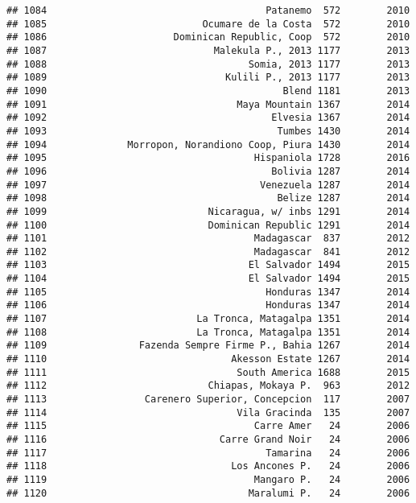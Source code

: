 \documentclass[
]{article}
\begin{document}
\begin{verbatim}
## 1084                                      Patanemo  572        2010
## 1085                           Ocumare de la Costa  572        2010
## 1086                      Dominican Republic, Coop  572        2010
## 1087                             Malekula P., 2013 1177        2013
## 1088                                   Somia, 2013 1177        2013
## 1089                               Kulili P., 2013 1177        2013
## 1090                                         Blend 1181        2013
## 1091                                 Maya Mountain 1367        2014
## 1092                                       Elvesia 1367        2014
## 1093                                        Tumbes 1430        2014
## 1094              Morropon, Norandiono Coop, Piura 1430        2014
## 1095                                    Hispaniola 1728        2016
## 1096                                       Bolivia 1287        2014
## 1097                                     Venezuela 1287        2014
## 1098                                        Belize 1287        2014
## 1099                            Nicaragua, w/ inbs 1291        2014
## 1100                            Dominican Republic 1291        2014
## 1101                                    Madagascar  837        2012
## 1102                                    Madagascar  841        2012
## 1103                                   El Salvador 1494        2015
## 1104                                   El Salvador 1494        2015
## 1105                                      Honduras 1347        2014
## 1106                                      Honduras 1347        2014
## 1107                          La Tronca, Matagalpa 1351        2014
## 1108                          La Tronca, Matagalpa 1351        2014
## 1109                Fazenda Sempre Firme P., Bahia 1267        2014
## 1110                                Akesson Estate 1267        2014
## 1111                                 South America 1688        2015
## 1112                            Chiapas, Mokaya P.  963        2012
## 1113                 Carenero Superior, Concepcion  117        2007
## 1114                                 Vila Gracinda  135        2007
## 1115                                    Carre Amer   24        2006
## 1116                              Carre Grand Noir   24        2006
## 1117                                      Tamarina   24        2006
## 1118                                Los Ancones P.   24        2006
## 1119                                    Mangaro P.   24        2006
## 1120                                   Maralumi P.   24        2006

\end{verbatim}
\end{document}
